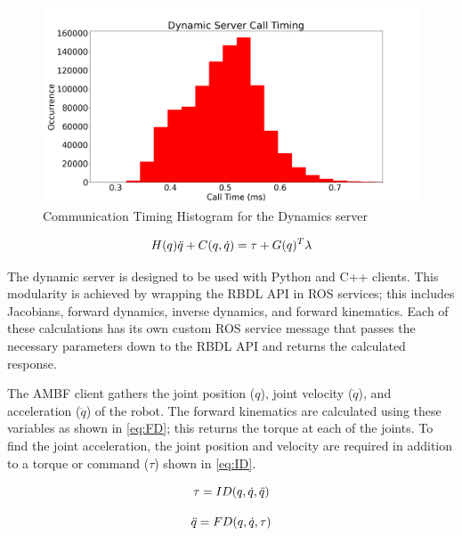 \begin{figure}
     \centering
     \includegraphics[scale=0.35]{images/software/dyn_loop_timing.png}
     \caption[Dynamic Timing Histogram]{Communication Timing Histogram for the Dynamics server}
     \label{fig:DynCommunicationHistogram}
 \end{figure}
 


\begin{equation}
    H(q) \Ddot{q} + C(q,\Dot{q}) = \tau + G(q)^T \lambda
    \label{eq:motion}
\end{equation}



The dynamic server is designed to be used with Python and C++ clients. This modularity is achieved by wrapping the RBDL API in ROS services; this includes Jacobians, forward dynamics, inverse dynamics, and forward kinematics. Each of these calculations has its own custom ROS service message that passes the necessary parameters down to the RBDL API and returns the calculated response. 

The AMBF client gathers the joint position ($q$), joint velocity ($\Dot{q}$), and acceleration ($\DDot{q}$) of the robot.  The forward kinematics are calculated using these variables as shown in \autoref{eq:FD}; this returns the torque at each of the joints. To find the joint acceleration, the joint position and velocity are required in addition to a torque or command ($\tau$) shown in \autoref{eq:ID}.  

\begin{equation}
    \tau = ID(q,\Dot{q}, \Ddot{q})
    \label{eq:ID}
\end{equation}


\begin{equation}
    \Ddot{q} = FD(q,\Dot{q}, \tau )
    \label{eq:FD}
\end{equation}


